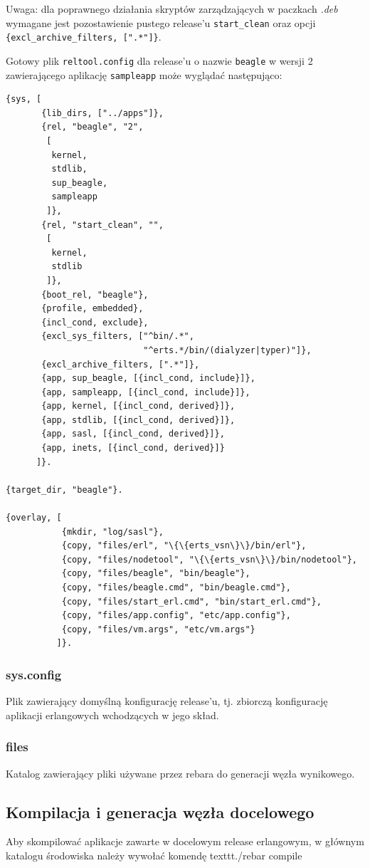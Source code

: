 \documentclass[polish,12pt]{aghthesis}
\begin{document}
Uwaga: dla poprawnego działania skryptów zarządzających w paczkach \emph{.deb} wymagane jest pozostawienie pustego release'u \texttt{start\_clean} oraz opcji \texttt{\{excl\_archive\_filters, [".*"]\}}.

Gotowy plik \texttt{reltool.config} dla release'u o nazwie \texttt{beagle} w wersji 2 zawierającego aplikację \texttt{sampleapp} może wyglądać następująco:
\begin{lstlisting}
{sys, [
       {lib_dirs, ["../apps"]},
       {rel, "beagle", "2",
        [
         kernel,
         stdlib,
         sup_beagle,
         sampleapp
        ]},
       {rel, "start_clean", "",
        [
         kernel,
         stdlib
        ]},
       {boot_rel, "beagle"},
       {profile, embedded},
       {incl_cond, exclude},
       {excl_sys_filters, ["^bin/.*",
                           "^erts.*/bin/(dialyzer|typer)"]},
       {excl_archive_filters, [".*"]},
       {app, sup_beagle, [{incl_cond, include}]},
       {app, sampleapp, [{incl_cond, include}]},
       {app, kernel, [{incl_cond, derived}]},
       {app, stdlib, [{incl_cond, derived}]},
       {app, sasl, [{incl_cond, derived}]},
       {app, inets, [{incl_cond, derived}]}
      ]}.

{target_dir, "beagle"}.

{overlay, [
           {mkdir, "log/sasl"},
           {copy, "files/erl", "\{\{erts_vsn\}\}/bin/erl"},
           {copy, "files/nodetool", "\{\{erts_vsn\}\}/bin/nodetool"},
           {copy, "files/beagle", "bin/beagle"},
           {copy, "files/beagle.cmd", "bin/beagle.cmd"},
           {copy, "files/start_erl.cmd", "bin/start_erl.cmd"},
           {copy, "files/app.config", "etc/app.config"},
           {copy, "files/vm.args", "etc/vm.args"}
          ]}.
\end{lstlisting}
\subsubsection{sys.config}
Plik zawierający domyślną konfigurację release'u, tj. zbiorczą konfigurację aplikacji erlangowych wchodzących w jego skład.

\subsubsection{files}
Katalog zawierający pliki używane przez rebara do generacji węzła wynikowego.

\subsection{Kompilacja i generacja węzła docelowego}
Aby skompilować aplikacje zawarte w docelowym release erlangowym, w głównym katalogu środowiska należy wywołać komendę texttt{./rebar compile}
\end{document}
